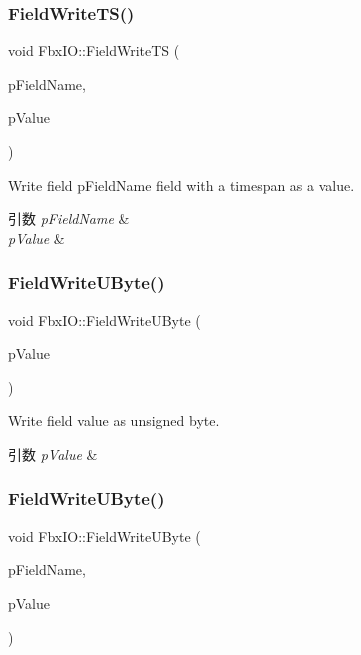\subsubsection{\texorpdfstring{Field\+Write\+T\+S()}{FieldWriteTS()}\hspace{0.1cm}{\footnotesize\ttfamily [2/2]}}
{\footnotesize\ttfamily void Fbx\+I\+O\+::\+Field\+Write\+TS (\begin{DoxyParamCaption}\item[{const char $\ast$}]{p\+Field\+Name,  }\item[{\hyperlink{class_fbx_time_span}{Fbx\+Time\+Span}}]{p\+Value }\end{DoxyParamCaption})}

Write field p\+Field\+Name field with a timespan as a value. 
\begin{DoxyParams}{引数}
{\em p\+Field\+Name} & \\
\hline
{\em p\+Value} & \\
\hline
\end{DoxyParams}
\mbox{\label{class_fbx_i_o_a797df2cffb604c4563c66e5a8da70837}} 
\subsubsection{\texorpdfstring{Field\+Write\+U\+Byte()}{FieldWriteUByte()}\hspace{0.1cm}{\footnotesize\ttfamily [1/2]}}
{\footnotesize\ttfamily void Fbx\+I\+O\+::\+Field\+Write\+U\+Byte (\begin{DoxyParamCaption}\item[{\hyperlink{fbxtypes_8h_a1be3cadf61e76f49142eb83e66ffe8bd}{Fbx\+U\+Char}}]{p\+Value }\end{DoxyParamCaption})}

Write field value as unsigned byte. 
\begin{DoxyParams}{引数}
{\em p\+Value} & \\
\hline
\end{DoxyParams}
\mbox{\label{class_fbx_i_o_aec40b520ebc6bb80daf1cd76d46a102b}} 
\subsubsection{\texorpdfstring{Field\+Write\+U\+Byte()}{FieldWriteUByte()}\hspace{0.1cm}{\footnotesize\ttfamily [2/2]}}
{\footnotesize\ttfamily void Fbx\+I\+O\+::\+Field\+Write\+U\+Byte (\begin{DoxyParamCaption}\item[{const char $\ast$}]{p\+Field\+Name,  }\item[{\hyperlink{fbxtypes_8h_a1be3cadf61e76f49142eb83e66ffe8bd}{Fbx\+U\+Char}}]{p\+Value }\end{DoxyParamCaption})}


